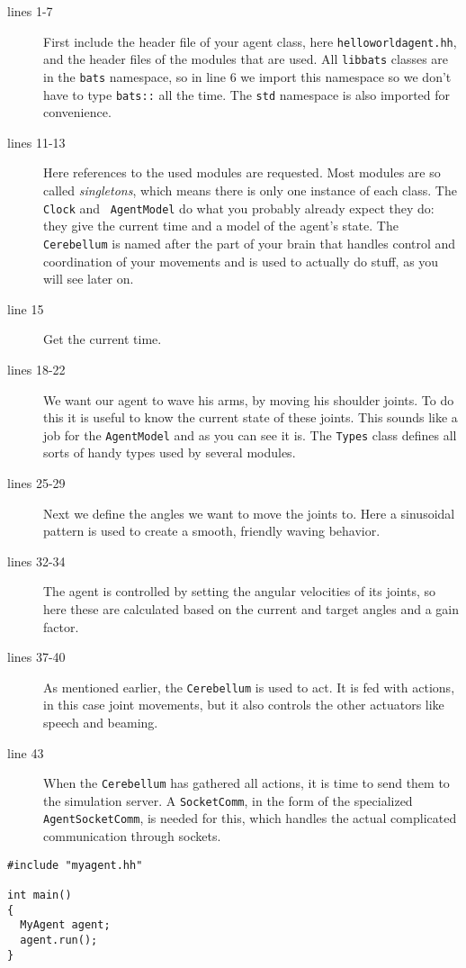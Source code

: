\begin{description}
\item[lines 1-7] First include the header file of your agent class,
  here {\tt helloworldagent.hh}, and the header files of the modules
  that are used. All {\tt libbats} classes are in the {\tt bats}
  namespace, so in line 6 we import this namespace so we don't have to
  type {\tt bats::} all the time. The {\tt std} namespace is also
  imported for convenience.
\item[lines 11-13] Here references to the used modules are
  requested. Most modules are so called \emph{singletons}, which means
  there is only one instance of each class. The {\tt Clock} and {\tt
    AgentModel} do what you probably already expect they do: they give
  the current time and a model of the agent's state. The {\tt
    Cerebellum} is named after the part of your brain that handles
  control and coordination of your movements and is used to actually
  do stuff, as you will see later on.
\item[line 15] Get the current time.
\item[lines 18-22] We want our agent to wave his arms, by moving his
  shoulder joints. To do this it is useful to know the current state
  of these joints. This sounds like a job for the {\tt AgentModel} and
  as you can see it is. The {\tt Types} class defines all sorts of
  handy types used by several modules.
\item[lines 25-29] Next we define the angles we want to move the
  joints to. Here a sinusoidal pattern is used to create a smooth,
  friendly waving behavior.
\item[lines 32-34] The agent is controlled by setting the angular
  velocities of its joints, so here these are calculated based on the
  current and target angles and a gain factor.
\item[lines 37-40] As mentioned earlier, the {\tt Cerebellum} is used
  to act. It is fed with actions, in this case joint movements, but it
  also controls the other actuators like speech and beaming.
\item[line 43] When the {\tt Cerebellum} has gathered all actions, it
  is time to send them to the simulation server. A {\tt SocketComm},
  in the form of the specialized {\tt AgentSocketComm}, is needed for
  this, which handles the actual complicated communication through
  sockets.
\end{description}

\newpage

\begin{lstlisting}[float,caption={\tt main.cc},label=codeMaincc,frame=single]
#include "myagent.hh"

int main()
{
  MyAgent agent;
  agent.run();
}
\end{lstlisting}

